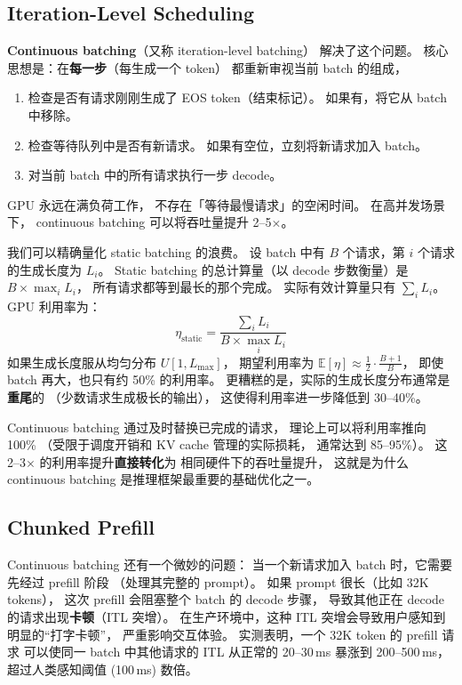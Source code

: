 \subsection{Iteration-Level Scheduling}

\textbf{Continuous batching}（又称 iteration-level batching）
解决了这个问题。
核心思想是：在\textbf{每一步}（每生成一个 token）
都重新审视当前 batch 的组成，
\begin{enumerate}[noitemsep]
  \item 检查是否有请求刚刚生成了 EOS token（结束标记）。
        如果有，将它从 batch 中移除。
  \item 检查等待队列中是否有新请求。
        如果有空位，立刻将新请求加入 batch。
  \item 对当前 batch 中的所有请求执行一步 decode。
\end{enumerate}

GPU 永远在满负荷工作，
不存在「等待最慢请求」的空闲时间。
在高并发场景下，
continuous batching 可以将吞吐量提升 2--5$\times$。

\begin{corebox}
我们可以精确量化 static batching 的浪费。
设 batch 中有 $B$ 个请求，第 $i$ 个请求的生成长度为 $L_i$。
Static batching 的总计算量（以 decode 步数衡量）是 $B \times \max_i L_i$，
所有请求都等到最长的那个完成。
实际有效计算量只有 $\sum_i L_i$。
GPU 利用率为：
\begin{equation}
  \eta_{\text{static}} = \frac{\sum_i L_i}{B \times \max_i L_i}
\end{equation}
如果生成长度服从均匀分布 $U[1, L_{\max}]$，
期望利用率为 $\mathbb{E}[\eta] \approx \frac{1}{2} \cdot \frac{B+1}{B}$，
即使 batch 再大，也只有约 50\% 的利用率。
更糟糕的是，实际的生成长度分布通常是\textbf{重尾}的
（少数请求生成极长的输出），
这使得利用率进一步降低到 30--40\%。

Continuous batching 通过及时替换已完成的请求，
理论上可以将利用率推向 100\%
（受限于调度开销和 KV cache 管理的实际损耗，
通常达到 85--95\%）。
这 2--3$\times$ 的利用率提升\textbf{直接转化}为
相同硬件下的吞吐量提升，
这就是为什么 continuous batching
是推理框架最重要的基础优化之一。
\end{corebox}

\subsection{Chunked Prefill}

Continuous batching 还有一个微妙的问题：
当一个新请求加入 batch 时，它需要先经过 prefill 阶段
（处理其完整的 prompt）。
如果 prompt 很长（比如 32K tokens），
这次 prefill 会阻塞整个 batch 的 decode 步骤，
导致其他正在 decode 的请求出现\textbf{卡顿}（ITL 突增）。
在生产环境中，这种 ITL 突增会导致用户感知到明显的“打字卡顿”，
严重影响交互体验。
实测表明，一个 32K token 的 prefill 请求
可以使同一 batch 中其他请求的 ITL
从正常的 20--30\,ms 暴涨到 200--500\,ms，
超过人类感知阈值 (100\,ms) 数倍。


